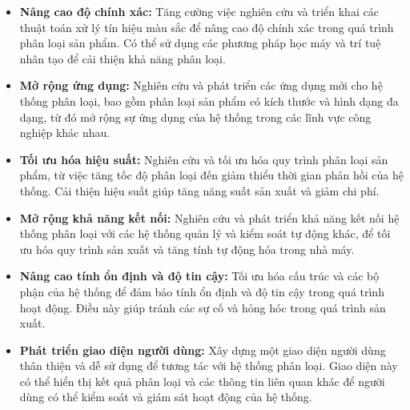 \documentclass[12pt]{report}
\begin{document}
\begin{itemize}[itemsep=0pt, parsep=0pt]
    \item \textbf{Nâng cao độ chính xác:} Tăng cường việc nghiên cứu và triển khai các thuật toán xử lý tín hiệu màu sắc để nâng cao độ chính xác trong quá trình phân loại sản phẩm. Có thể sử dụng các phương pháp học máy và trí tuệ nhân tạo để cải thiện khả năng phân loại.
    
    \item \textbf{Mở rộng ứng dụng:} Nghiên cứu và phát triển các ứng dụng mới cho hệ thống phân loại, bao gồm phân loại sản phẩm có kích thước và hình dạng đa dạng, từ đó mở rộng sự ứng dụng của hệ thống trong các lĩnh vực công nghiệp khác nhau.
    
    \item \textbf{Tối ưu hóa hiệu suất:} Nghiên cứu và tối ưu hóa quy trình phân loại sản phẩm, từ việc tăng tốc độ phân loại đến giảm thiểu thời gian phản hồi của hệ thống. Cải thiện hiệu suất giúp tăng năng suất sản xuất và giảm chi phí.
    
    \item \textbf{Mở rộng khả năng kết nối:} Nghiên cứu và phát triển khả năng kết nối hệ thống phân loại với các hệ thống quản lý và kiểm soát tự động khác, để tối ưu hóa quy trình sản xuất và tăng tính tự động hóa trong nhà máy.
    
    \item \textbf{Nâng cao tính ổn định và độ tin cậy:} Tối ưu hóa cấu trúc và các bộ phận của hệ thống để đảm bảo tính ổn định và độ tin cậy trong quá trình hoạt động. Điều này giúp tránh các sự cố và hỏng hóc trong quá trình sản xuất.
    
    \item \textbf{Phát triển giao diện người dùng:} Xây dựng một giao diện người dùng thân thiện và dễ sử dụng để tương tác với hệ thống phân loại. Giao diện này có thể hiển thị kết quả phân loại và các thông tin liên quan khác để người dùng có thể kiểm soát và giám sát hoạt động của hệ thống.
\end{itemize}
\end{document}
